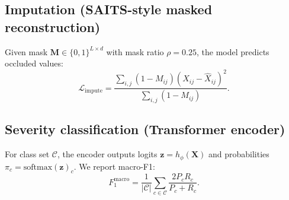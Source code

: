 \subsection{Imputation (SAITS-style masked reconstruction)}

Given mask $\mathbf{M}\in\{0,1\}^{L\times d}$ with mask ratio $\rho=0.25$, the model predicts occluded values:
\begin{equation}
\label{eq:saits_loss}
\mathcal{L}_{\mathrm{impute}} = \frac{\sum_{i,j}(1-M_{ij})(X_{ij}-\hat{X}_{ij})^2}{\sum_{i,j}(1-M_{ij})}.
\end{equation}

\subsection{Severity classification (Transformer encoder)}

For class set $\mathcal{C}$, the encoder outputs logits $\mathbf{z}=h_\phi(\mathbf{X})$ and probabilities $\pi_c=\mathrm{softmax}(\mathbf{z})_c$. We report macro-F1:
\begin{equation}
\label{eq:macro_f1}
F_1^{\mathrm{macro}} = \frac{1}{|\mathcal{C}|}\sum_{c\in\mathcal{C}}\frac{2P_c R_c}{P_c+R_c}.
\end{equation}
